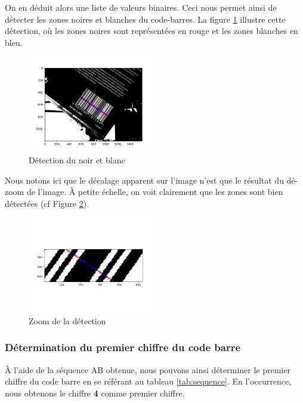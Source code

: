\documentclass{rapport}
\begin{document}
On en déduit alors une liste de valeurs binaires. Ceci nous permet ainsi de détecter les zones noires et blanches du code-barres. 
La figure \ref{fig:detection} illustre cette détection, où les zones noires sont représentées en rouge et les zones blanches en bleu.

\begin{figure}[H] 
	\centering
	\includegraphics[width=0.5\textwidth]{images/code_seuille_couleur.png}
	\caption{Détection du noir et blanc}
	\label{fig:detection}
\end{figure}

Nous notons ici que le décalage apparent sur l'image n'est que le résultat du dé-zoom de l'image.
À petite échelle, on voit clairement que les zones sont bien détectées (cf Figure \ref{fig:detection_zoom}). 

\begin{figure}[H] 
	\centering
	\includegraphics[width=0.5\textwidth]{images/zoom_code_seuille_couleur.png}
	\caption{Zoom de la détection}
	\label{fig:detection_zoom}
\end{figure}

\subsubsection*{Détermination du premier chiffre du code barre}
À l'aide de la séquence AB obtenue, nous pouvons ainsi déterminer le premier chiffre du code barre en se référant au tableau \ref{tab:sequence}.
En l'occurrence, nous obtenons le chiffre \textbf{4} comme premier chiffre. 
\end{document}
